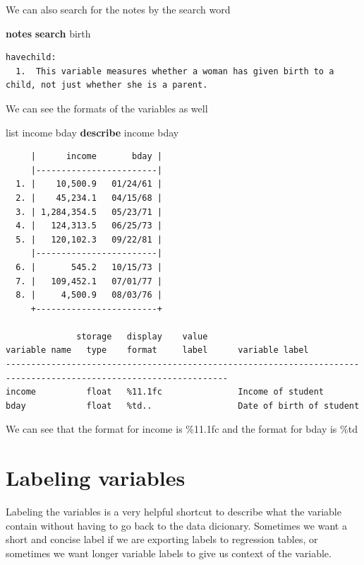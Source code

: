 \documentclass[
]{book}
\newenvironment{Shaded}{\begin{snugshade}}{\end{snugshade}}
\newcommand{\KeywordTok}[1]{\textcolor[rgb]{0.13,0.29,0.53}{\textbf{#1}}}
\newcommand{\NormalTok}[1]{#1}
\newcommand{\OtherTok}[1]{\textcolor[rgb]{0.56,0.35,0.01}{#1}}
\begin{document}
We can also search for the notes by the search word

\begin{Shaded}
\begin{Highlighting}[]
\KeywordTok{notes} \KeywordTok{search}\NormalTok{ birth}
\end{Highlighting}
\end{Shaded}

\begin{verbatim}
havechild:
  1.  This variable measures whether a woman has given birth to a child, not just whether she is a parent.
\end{verbatim}

We can see the formats of the variables as well

\begin{Shaded}
\begin{Highlighting}[]
\OtherTok{list}\NormalTok{ income bday}
\KeywordTok{describe}\NormalTok{ income bday}
\end{Highlighting}
\end{Shaded}

\begin{verbatim}
     |      income       bday |
     |------------------------|
  1. |    10,500.9   01/24/61 |
  2. |    45,234.1   04/15/68 |
  3. | 1,284,354.5   05/23/71 |
  4. |   124,313.5   06/25/73 |
  5. |   120,102.3   09/22/81 |
     |------------------------|
  6. |       545.2   10/15/73 |
  7. |   109,452.1   07/01/77 |
  8. |     4,500.9   08/03/76 |
     +------------------------+

              storage   display    value
variable name   type    format     label      variable label
------------------------------------------------------------------------------------------------------------------
income          float   %11.1fc               Income of student
bday            float   %td..                 Date of birth of student
\end{verbatim}

We can see that the format for income is \%11.1fc and the format for bday is \%td

\section{Labeling variables}\label{labeling-variables}

Labeling the variables is a very helpful shortcut to describe what the variable contain without having to go back to the data dicionary. Sometimes we want a short and concise label if we are exporting labels to regression tables, or sometimes we want longer variable labels to give us context of the variable.
\end{document}
